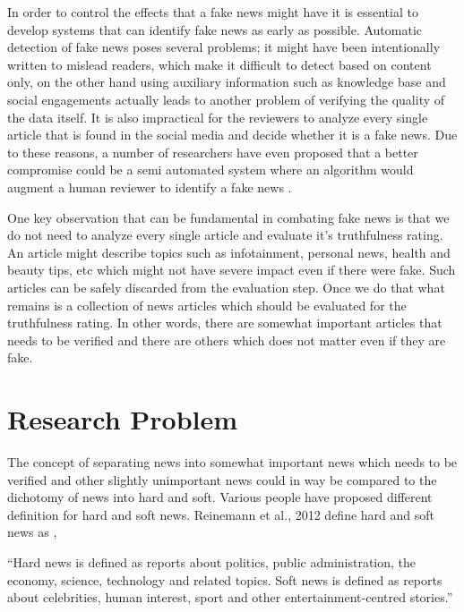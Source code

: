In order to control the effects that a fake news might have it is essential to develop systems that can identify fake news as early as possible. Automatic detection of fake news poses several problems; it might have been intentionally written to mislead readers, which make it difficult to detect based on content only, on the other hand using auxiliary information such as knowledge base and social engagements actually leads to another problem of verifying the quality of the data itself\cite{shu2017fake}. It is also impractical for the reviewers to analyze every single article that is found in the social media and decide whether it is a fake news. Due to these reasons, a number of researchers have even proposed that a better compromise could be a semi automated system where an algorithm would augment a human reviewer to identify a fake news \cite{conroy2015automatic} \cite{chen2015news} \cite{wiegand2016veracity}. 

One key observation that can be fundamental in combating fake news is that we do not need to analyze every single article and evaluate it's truthfulness rating. An article might describe topics such as infotainment, personal news, health and beauty tips, etc which might not have severe impact even if there were fake. Such articles can be safely discarded from the evaluation step. Once we do that what remains is a collection of news articles which should be evaluated for the truthfulness rating. In other words, there are somewhat important articles that needs to be verified and there are others which does not matter even if they are fake.

\section{Research Problem} \label{intro:research}
The concept of separating news into somewhat important news which needs to be verified and other slightly unimportant news could in way be compared to the dichotomy of news into hard and soft. Various people have proposed different definition for hard and soft news\cite{reinemann2012hard}\cite{shoemaker2012news}. Reinemann et al., 2012 define hard and soft news as \cite{reinemann2012hard},

\enquote{Hard news is defined as reports about politics, public administration, the economy, science, technology and related topics. Soft news is defined as reports about celebrities, human interest, sport and other entertainment-centred stories.}

